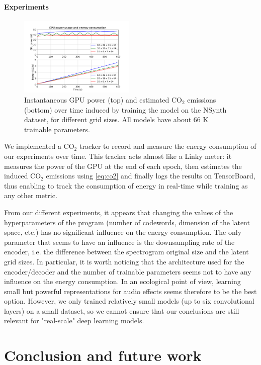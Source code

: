 \documentclass{article}
\begin{document}
\paragraph*{Experiments}

\begin{figure}
    \centering
    \includegraphics[width=0.49\textwidth]{figs/co2.pdf}
    \caption{Instantaneous GPU power (top) and estimated CO$_2$ emissions (bottom) over time induced by training the model on the NSynth dataset, for different grid sizes. All models have about 66 K trainable parameters.}
    \label{fig:co2}
\end{figure}

We implemented a CO$_2$ tracker to record and measure the energy consumption of our experiments over time. This tracker acts almost like a Linky meter: it measures the power of the GPU at the end of each epoch, then estimates the induced CO$_2$ emissions using \autoref{eq:co2} and finally logs the results on TensorBoard, thus enabling to track the consumption of energy in real-time while training as any other metric.

From our different experiments, it appears that changing the values of the hyperparameters of the program (number of codewords, dimension of the latent space, etc.) has no significant influence on the energy consumption. The only parameter that seems to have an influence is the downsampling rate of the encoder, i.e. the difference between the spectrogram original size and the latent grid sizes. In particular, it is worth noticing that the architecture used for the encoder/decoder and the number of trainable parameters seems not to have any influence on the energy consumption. In an ecological point of view, learning small but powerful representations for audio effects seems therefore to be the best option. However, we only trained relatively small models (up to six convolutional layers) on a small dataset, so we cannot ensure that our conclusions are still relevant for "real-scale" deep learning models.

\section{Conclusion and future work}\label{sec:conclusion}
\end{document}
